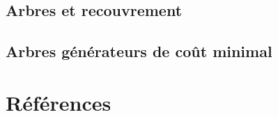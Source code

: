 \documentclass[
  letterpaper,
]{scrbook}
\newlength{\cslhangindent}
\newlength{\cslentryspacingunit} %
\newenvironment{CSLReferences}[2] %
 {%
  \setlength{\parindent}{0pt}
  \ifodd #1
  \let\oldpar\par
  \def\par{\hangindent=\cslhangindent\oldpar}
  \fi
  \setlength{\parskip}{#2\cslentryspacingunit}
 }%
 {}
\theoremstyle{plain}
\theoremstyle{definition}
\theoremstyle{definition}
\theoremstyle{remark}
\begin{document}
\hypertarget{arbres-et-recouvrement}{%
\section{Arbres et recouvrement}\label{arbres-et-recouvrement}}

\hypertarget{arbres-guxe9nuxe9rateurs-de-couxfbt-minimal}{%
\section{Arbres générateurs de coût
minimal}\label{arbres-guxe9nuxe9rateurs-de-couxfbt-minimal}}


\hypertarget{ruxe9fuxe9rences}{%
\chapter*{Références}\label{ruxe9fuxe9rences}}


\hypertarget{refs}{}
\begin{CSLReferences}{0}{0}
\end{CSLReferences}


\backmatter
\end{document}
